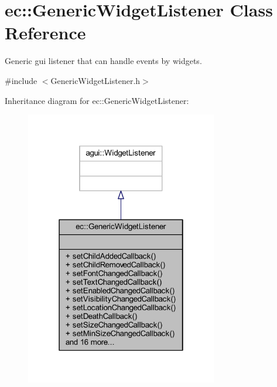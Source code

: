 \hypertarget{classec_1_1_generic_widget_listener}{}\section{ec\+:\+:Generic\+Widget\+Listener Class Reference}
\label{classec_1_1_generic_widget_listener}


Generic gui listener that can handle events by widgets.  




{\ttfamily \#include $<$Generic\+Widget\+Listener.\+h$>$}



Inheritance diagram for ec\+:\+:Generic\+Widget\+Listener\+:\nopagebreak
\begin{figure}[H]
\begin{center}
\leavevmode
\includegraphics[width=238pt]{classec_1_1_generic_widget_listener__inherit__graph}
\end{center}
\end{figure}


